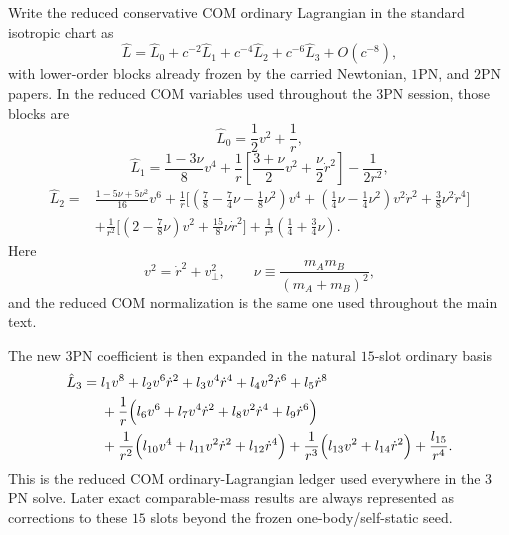\documentclass[11pt]{article}
\begin{document}
Write the reduced conservative COM ordinary Lagrangian in the standard isotropic
chart as
\begin{equation}
\hat L=\hat L_0+c^{-2}\hat L_1+c^{-4}\hat L_2+c^{-6}\hat L_3+O(c^{-8}),
\label{eq:app-com-compiler-L-expansion}
\end{equation}
with lower-order blocks already frozen by the carried Newtonian, $1$PN, and
$2$PN papers.  In the reduced COM variables used throughout the $3$PN session,
those blocks are
\begin{equation}
\hat L_0=\frac12 v^2+\frac1r,
\label{eq:app-com-compiler-L0}
\end{equation}
\begin{equation}
\hat L_1
=
\frac{1-3\nu}{8}v^4
+\frac1r\left[\frac{3+\nu}{2}v^2+\frac{\nu}{2}\dot r^2\right]
-\frac{1}{2r^2},
\label{eq:app-com-compiler-L1}
\end{equation}
\begin{align}
\hat L_2
={}&
\frac{1-5\nu+5\nu^2}{16}v^6
+\frac1r\Bigg[
\left(\frac78-\frac74\nu-\frac18\nu^2\right)v^4
+\left(\frac14\nu-\frac14\nu^2\right)v^2\dot r^2
+\frac38\nu^2\dot r^4
\Bigg]
\nonumber\\
&
+\frac1{r^2}\Bigg[
\left(2-\frac78\nu\right)v^2
+\frac{15}{8}\nu\dot r^2
\Bigg]
+\frac1{r^3}\left(\frac14+\frac34\nu\right).
\label{eq:app-com-compiler-L2}
\end{align}
Here
\begin{equation}
v^2=\dot r^2+v_\perp^2,
\qquad
\nu\equiv\frac{m_A m_B}{(m_A+m_B)^2},
\label{eq:app-com-compiler-v2nu}
\end{equation}
and the reduced COM normalization is the same one used throughout the main text.

The new $3$PN coefficient is then expanded in the natural $15$-slot ordinary
basis
\begin{align}
\hat L_3
={}&
 l_1 v^8 + l_2 v^6\dot r^2 + l_3 v^4\dot r^4 + l_4 v^2\dot r^6 + l_5\dot r^8
\nonumber\\
&
+\frac1r\Bigl(l_6 v^6 + l_7 v^4\dot r^2 + l_8 v^2\dot r^4 + l_9\dot r^6\Bigr)
\nonumber\\
&
+\frac1{r^2}\Bigl(l_{10} v^4 + l_{11} v^2\dot r^2 + l_{12}\dot r^4\Bigr)
+\frac1{r^3}\Bigl(l_{13} v^2 + l_{14}\dot r^2\Bigr)
+\frac{l_{15}}{r^4}.
\label{eq:app-com-compiler-L3-basis}
\end{align}
This is the reduced COM ordinary-Lagrangian ledger used everywhere in the $3$PN
solve.  Later exact comparable-mass results are always represented as
corrections to these $15$ slots beyond the frozen one-body/self-static seed.
\end{document}
